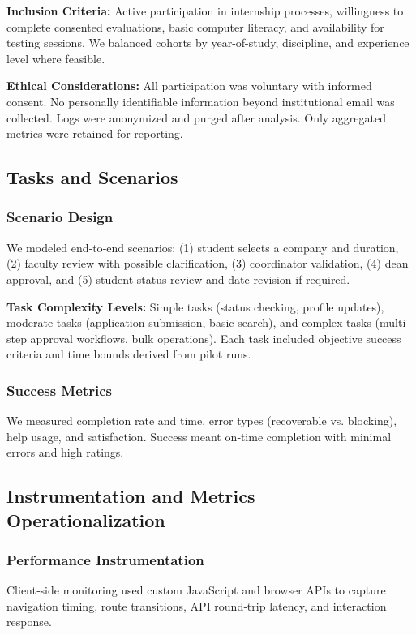 \documentclass[conference]{IEEEtran}
\begin{document}
\textbf{Inclusion Criteria:} Active participation in internship processes, willingness to complete consented evaluations, basic computer literacy, and availability for testing sessions. We balanced cohorts by year-of-study, discipline, and experience level where feasible.

\textbf{Ethical Considerations:} All participation was voluntary with informed consent. No personally identifiable information beyond institutional email was collected. Logs were anonymized and purged after analysis. Only aggregated metrics were retained for reporting.

\subsection{Tasks and Scenarios}

\subsubsection{Scenario Design}
We modeled end‑to‑end scenarios: (1) student selects a company and duration, (2) faculty review with possible clarification, (3) coordinator validation, (4) dean approval, and (5) student status review and date revision if required.

\textbf{Task Complexity Levels:} Simple tasks (status checking, profile updates), moderate tasks (application submission, basic search), and complex tasks (multi-step approval workflows, bulk operations). Each task included objective success criteria and time bounds derived from pilot runs.

\subsubsection{Success Metrics}
We measured completion rate and time, error types (recoverable vs. blocking), help usage, and satisfaction. Success meant on‑time completion with minimal errors and high ratings.

\subsection{Instrumentation and Metrics Operationalization}

\subsubsection{Performance Instrumentation}
Client‑side monitoring used custom JavaScript and browser APIs to capture navigation timing, route transitions, API round‑trip latency, and interaction response.
\end{document}
